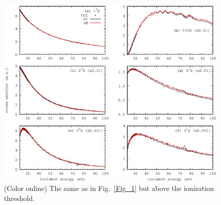 \documentclass[aip
, pra
, showpacs
, aps
, twocolumn
, groupedaddress
, floatfix
]{revtex4}
\begin{document}
\begin{figure}[htb]
\includegraphics[scale=1]{fig1b.ps}
\caption{(Color online)
The same as in Fig.~\ref{Fig_1} but above the ionization threshold.
}
\label{Fig_1b}
\end{figure}
\end{document}
